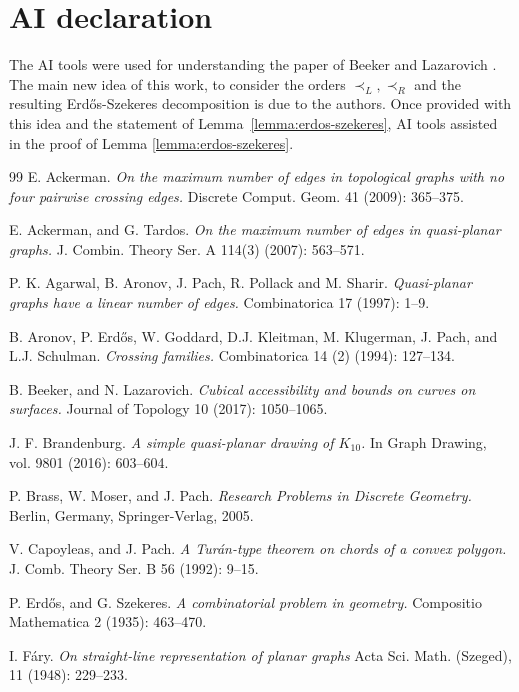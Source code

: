 \documentclass[11pt]{amsart}
\theoremstyle{definition}
\begin{document}
\section*{AI declaration}

The AI tools were used for understanding the paper of Beeker and Lazarovich \cite{BL}. The main new idea of this work, to consider the orders $\prec_L, \prec_R$ and the resulting Erd\H{o}s-Szekeres decomposition is due to the authors. Once provided with this idea and the statement of Lemma~\ref{lemma:erdos-szekeres}, AI tools assisted in the proof of Lemma \ref{lemma:erdos-szekeres}. 

\vspace{-0.1cm}
\begin{thebibliography}{99}
E. Ackerman.
\emph{On the maximum number of edges in topological graphs with no four
pairwise crossing edges.}
Discrete Comput. Geom. 41 (2009): 365--375.

E. Ackerman, and G. Tardos.
\emph{On the maximum number of edges in quasi-planar graphs.}
J. Combin. Theory Ser. A 114(3) (2007): 563--571.

P. K. Agarwal, B. Aronov, J. Pach, R. Pollack and M. Sharir.
\emph{Quasi-planar graphs have a linear number of edges.}
Combinatorica 17 (1997): 1--9.

B. Aronov, P. Erd\H{o}s, W. Goddard, D.J. Kleitman, M. Klugerman, J. Pach, and L.J. Schulman. \emph{Crossing families.}
Combinatorica 14 (2) (1994): 127--134.

B. Beeker, and N. Lazarovich.
\emph{Cubical accessibility and bounds on curves on surfaces.}
Journal of Topology 10 (2017): 1050--1065.

J. F. Brandenburg.
\emph{A simple quasi-planar drawing of $K_{10}$.}
In Graph Drawing, vol. 9801 (2016): 603--604.

P. Brass, W. Moser, and J. Pach. 
\emph{Research Problems in Discrete Geometry.}
Berlin, Germany, Springer-Verlag, 2005.

V. Capoyleas, and J. Pach.
\emph{A Tur\'an-type theorem on chords of a convex polygon.}
J. Comb. Theory Ser. B 56 (1992): 9--15.

P. Erd\H{o}s, and G. Szekeres.
\emph{A combinatorial problem in geometry.}
Compositio Mathematica 2 (1935): 463--470.

I. F\'ary.
\emph{On straight-line representation of planar graphs}
Acta Sci. Math. (Szeged), 11 (1948): 229--233.


\end{thebibliography}
\end{document}

